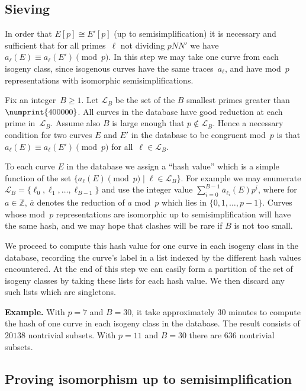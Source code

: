\documentclass[12pt]{amsart}
\newcommand{\Z}{\mathbb{Z}}
\newcommand{\calL}{\mathcal{L}}
\numberwithin{equation}{section}
\theoremstyle{definition}
\theoremstyle{remark}
\begin{document}
\subsection{Sieving}
In order that $E[p]\cong E'[p]$ (up to semisimplification) it is
necessary and sufficient that for all primes~$\ell$ not dividing
$pNN'$ we have $a_{\ell}(E)\equiv a_{\ell}(E')\pmod{p}$.  In this step
we may take one curve from each isogeny class, since isogenous curves
have the same traces~$a_\ell$, and have mod~$p$ representations with
isomorphic semisimplifications.

Fix an integer~$B\ge1$.  Let $\calL_B$ be the set of the $B$ smallest
primes greater than $\numprint{400000}$. All curves in the database
have good reduction at each prime in~$\calL_B$.  Assume also $B$ is
large enough that $p\notin\calL_B$.  Hence a necessary condition for
two curves $E$ and $E'$ in the database to be congruent mod~$p$ is
that $a_{\ell}(E)\equiv a_{\ell}(E')\pmod{p}$ for all~$\ell\in\calL_B$.

To each curve $E$ in the database we assign a ``hash value'' which is
a simple function of the set $\{a_{\ell}(E)\pmod{p}\mid
\ell\in\calL_B\}$.  For example we may enumerate
$\calL_B=\{\ell_0,\ell_1,\dots,\ell_{B-1}\}$ and use the integer value
$\sum_{i=0}^{B-1}\overline{a}_{\ell_i}(E)p^i$, where for $a\in\Z$,
$\overline{a}$ denotes the reduction of $a$ mod~$p$ which lies in
$\{0,1,\dots,p-1\}$.  Curves whose mod~$p$ representations are
isomorphic up to semisimplification will have the same hash, and we
may hope that clashes will be rare if $B$ is not too small.

We proceed to compute this hash value for one curve in each isogeny
class in the database, recording the curve's label in a list indexed
by the different hash values encountered.  At the end of this step we
can easily form a partition of the set of isogeny classes by taking
these lists for each hash value.  We then discard any such lists which
are singletons.

{\bf Example.} With $p=7$ and $B=30$, it take approximately 30 minutes to
compute the hash of one curve in each isogeny class in the database.
The result consists of $20138$ nontrivial subsets.  With $p=11$ and
$B=30$ there are $636$ nontrivial subsets.

\subsection{Proving isomorphism up to semisimplification}
\end{document}
